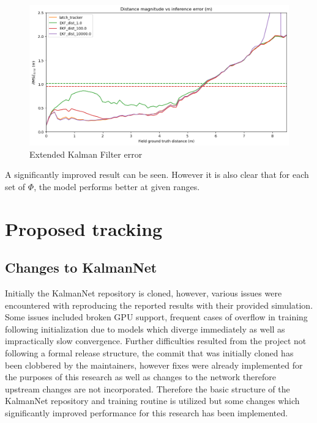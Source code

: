 \documentclass[a4paper,twoside,12pt]{report}
\begin{document}
\begin{figure}[h!]
\begin{center}
\includegraphics[width=13cm]{images/ekf_error.png}
\caption{Extended Kalman Filter error}
\label{fig:ekferror}
\end{center}
\end{figure}

A significantly improved result can be seen. However it is also clear that for each set of $\Phi$, the model performs better at given ranges. 


\section{Proposed tracking}


\subsection{Changes to KalmanNet}

Initially the KalmanNet repository is cloned, however, various issues were encountered with reproducing the reported results with their provided simulation. Some issues included broken GPU support, frequent cases of overflow in training following initialization due to models which diverge immediately as well as impractically slow convergence. Further difficulties resulted from the project not following a formal release structure, the commit that was initially cloned has been clobbered by the maintainers, however fixes were already implemented for the purposes of this research as well as changes to the network therefore upstream changes are not incorporated. Therefore the basic structure of the KalmanNet repository and training routine is utilized but some changes which significantly improved performance for this research has been implemented. 
\end{document}
